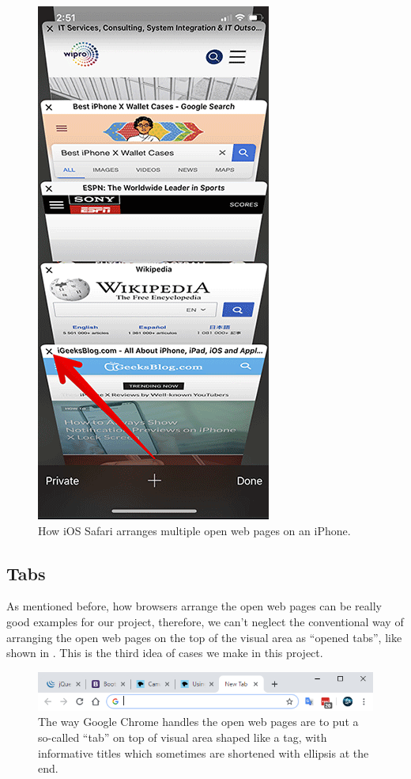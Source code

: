 \begin{figure}[th]
\centering
\includegraphics[width=.4\textwidth,keepaspectratio]{Figures/Chapter1/iossafari.png}
\decoRule
\caption[Means of Arrangements On iOS Safari]{How iOS Safari arranges multiple open web pages on an iPhone.}
\label{fig:iossafari}
\end{figure}

\subsection{Tabs}

As mentioned before, how browsers arrange the open web pages can be really good examples for our project, therefore, we can't neglect the conventional way of arranging the open web pages on the top of the visual area as ``opened tabs'', like shown in . This is the third idea of cases we make in this project.

\begin{figure}[H]
\centering
\includegraphics[width=\textwidth,keepaspectratio]{Figures/Chapter1/tabs.png}
\decoRule
\caption[How Google Chrome Arranged Objects of Interest]{The way Google Chrome handles the open web pages are to put a so-called ``tab'' on top of visual area shaped like a tag, with informative titles which sometimes are shortened with ellipsis at the end.}
\label{fig:tabs}
\end{figure}

